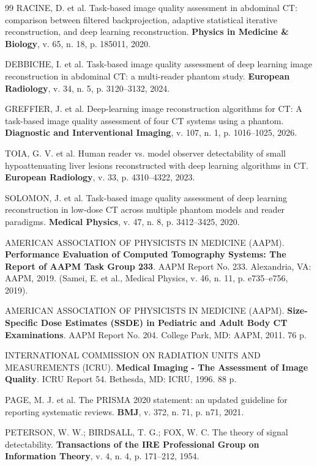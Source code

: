 \documentclass[
  12pt,
  a4paper,
  oneside
]{report}
\begin{document}
\begin{thebibliography}{99}
RACINE, D. et al. Task-based image quality assessment in abdominal CT: comparison between filtered backprojection, adaptive statistical iterative reconstruction, and deep learning reconstruction. \textbf{Physics in Medicine \& Biology}, v. 65, n. 18, p. 185011, 2020.

DEBBICHE, I. et al. Task-based image quality assessment of deep learning image reconstruction in abdominal CT: a multi-reader phantom study. \textbf{European Radiology}, v. 34, n. 5, p. 3120--3132, 2024.

GREFFIER, J. et al. Deep-learning image reconstruction algorithms for CT: A task-based image quality assessment of four CT systems using a phantom. \textbf{Diagnostic and Interventional Imaging}, v. 107, n. 1, p. 1016--1025, 2026.

TOIA, G. V. et al. Human reader vs. model observer detectability of small hypoattenuating liver lesions reconstructed with deep learning algorithms in CT. \textbf{European Radiology}, v. 33, p. 4310--4322, 2023.

SOLOMON, J. et al. Task-based image quality assessment of deep learning reconstruction in low-dose CT across multiple phantom models and reader paradigms. \textbf{Medical Physics}, v. 47, n. 8, p. 3412--3425, 2020.

AMERICAN ASSOCIATION OF PHYSICISTS IN MEDICINE (AAPM). \textbf{Performance Evaluation of Computed Tomography Systems: The Report of AAPM Task Group 233}. AAPM Report No. 233. Alexandria, VA: AAPM, 2019. (Samei, E. et al., Medical Physics, v. 46, n. 11, p. e735--e756, 2019).

AMERICAN ASSOCIATION OF PHYSICISTS IN MEDICINE (AAPM). \textbf{Size-Specific Dose Estimates (SSDE) in Pediatric and Adult Body CT Examinations}. AAPM Report No. 204. College Park, MD: AAPM, 2011. 76 p.

INTERNATIONAL COMMISSION ON RADIATION UNITS AND MEASUREMENTS (ICRU). \textbf{Medical Imaging - The Assessment of Image Quality}. ICRU Report 54. Bethesda, MD: ICRU, 1996. 88 p.

PAGE, M. J. et al. The PRISMA 2020 statement: an updated guideline for reporting systematic reviews. \textbf{BMJ}, v. 372, n. 71, p. n71, 2021.

PETERSON, W. W.; BIRDSALL, T. G.; FOX, W. C. The theory of signal detectability. \textbf{Transactions of the IRE Professional Group on Information Theory}, v. 4, n. 4, p. 171--212, 1954.


\end{thebibliography}
\end{document}
